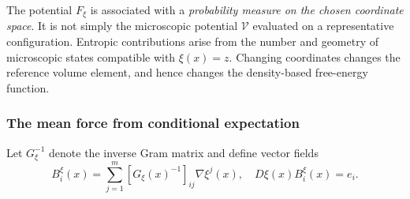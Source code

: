 \documentclass[12pt,a4paper,oneside]{book}
\begin{document}
% 
\begin{Notice}
The potential $F_\xi$ is associated with a \emph{probability measure on the
chosen coordinate space}. It is not simply the microscopic potential
$\mathcal V$ evaluated on a representative configuration. Entropic contributions
arise from the number and geometry of microscopic states compatible with
$\xi(x)=z$. Changing coordinates changes the reference volume element,
and hence changes the density-based free-energy function.
\end{Notice}

\subsubsection{The mean force from conditional expectation}
Let $G_\xi^{-1}$ denote the inverse Gram matrix and define vector fields
\begin{equation*}
B_i^\xi(x)=\sum_{j=1}^m[G_\xi(x)^{-1}]_{ij}\nabla\xi^j(x),
 \quad D\xi(x)B_i^\xi(x)=e_i.
\end{equation*}
\end{document}
